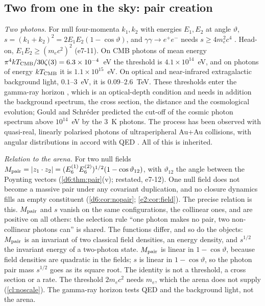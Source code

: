 \subsection{Two from one in the sky: pair creation}
\label{e7:sec:pairs}

\emph{Two photons.} For null four-momenta $k_1,k_2$ with energies $E_1,E_2$ at angle $\vartheta$, $s=(k_1+k_2)^2=2E_1E_2(1-\cos\vartheta)$, and
$\gamma\gamma\to e^+e^-$ needs $s\ge4m_e^2c^4$ \cite{BreitWheeler34}. Head-on, $E_1E_2\ge(m_ec^2)^2$ (e7-11). On CMB photons of mean energy
$\pi^4kT_{\rm CMB}/30\zeta(3)=6.3\times10^{-4}$~eV the threshold is $4.1\times10^{14}$~eV, and on photons of energy $kT_{\rm CMB}$ it is $1.1\times10^{15}$~eV. On
optical and near-infrared extragalactic background light, $0.1$--$3$~eV, it is $0.09$--$2.6$~TeV. These thresholds enter the gamma-ray horizon
\cite{Nikishov62,GouldSchreder67,DwekKrennrich13}, which is an optical-depth condition and needs in addition the background spectrum, the cross
section, the distance and the cosmological evolution; Gould and Schr\'eder predicted the cut-off of the cosmic photon spectrum above $10^{14}$~eV by
the $3$~K photons. The process has been observed with quasi-real, linearly polarised photons of ultraperipheral Au+Au collisions, with angular
distributions in accord with QED \cite{STAR21}. All of this is inherited.

\emph{Relation to the arena.} For two null fields $M_{\rm pair}=|z_1\cdot z_2|=(E_6^{(1)}E_6^{(2)})^{1/2}(1-\cos\vartheta_{12})$, with $\vartheta_{12}$ the
angle between the Poynting vectors (\cref{d6:thm:pair}(v); restated, e7-12). One null field does not become a massive pair under any
covariant duplication, and no closure dynamics fills an empty constituent (\cref{d6:cor:nopair}; \cref{e2:cor:field}). The precise
relation is this. $M_{\rm pair}$ and $s$ vanish on the same configurations, the collinear ones, and are positive on all others: the selection
rule ``one photon makes no pair, two non-collinear photons can'' is shared. The functions differ, and so do the objects: $M_{\rm pair}$ is an
invariant of two classical field densities, an energy density, and $s^{1/2}$ the invariant energy of a two-photon state. $M_{\rm pair}$ is linear
in $1-\cos\vartheta$, because field densities are quadratic in the fields; $s$ is linear in $1-\cos\vartheta$, so the photon pair mass $s^{1/2}$
goes as its square root. The identity is not a threshold, a cross section or a rate.
The threshold $2m_ec^2$ needs $m_e$, which the arena does not supply (\cref{cl:noscale}). The gamma-ray horizon tests QED and the
background light, not the arena.

